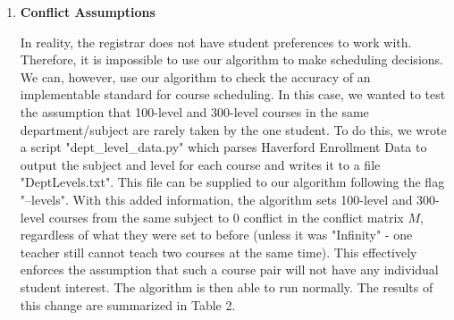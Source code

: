 \documentclass[11pt, oneside]{article}   	%
\begin{document}
\begin{enumerate}
The added constraints are passed through a file of the following format:\\

student\qquad weights \\
1 3 1 1 \\
2 2 2 1 1 \\
3 3 2 2  \\

Where weights are space-separated weights (totalling 10) for each student ordered the same as the student's list of classes in the preferences file

Registering for two courses does not mean that one wants to enroll in them equally. Thus, it is important to consider which courses would be most problematic to overlap. For this reason, adopting this added constraint improves the overall optimality of the algorithm in computing high preference schedules. The take away from this design change is that when scheduling courses, the registrar should take into account the (implicit) preferences of students. For example, if there are a lot of students who are computer science majors / math minors, a number of students will highly prefer taking those courses concurrently and they shouldn't be scheduled together. Similarly, if a number of junior computer science majors have outstanding distribution requirements in the humanities, the registrar should ensure that not too many CS courses are scheduled on top of humanities courses.\\

\item{\textbf{Conflict Assumptions}}

In reality, the registrar does not have student preferences to work with. Therefore, it is impossible to use our algorithm to make scheduling decisions. We can, however, use our algorithm to check the accuracy of an implementable standard for course scheduling. In this case, we wanted to test the assumption that 100-level and 300-level courses in the same department/subject are rarely taken by the one student. To do this, we wrote a script "dept\_level\_data.py" which parses Haverford Enrollment Data to output the subject and level for each course and writes it to a file "DeptLevels.txt". This file can be supplied to our algorithm following the flag "--levels". With this added information, the algorithm sets 100-level and 300-level courses from the same subject to $0$ conflict in the conflict matrix $M$, regardless of what they were set to before (unless it was "Infinity" - one teacher still cannot teach two courses at the same time). This effectively enforces the assumption that such a course pair will not have any individual student interest. The algorithm is then able to run normally. The results of this change are summarized in Table 2.\\


\end{enumerate}
\end{document}
